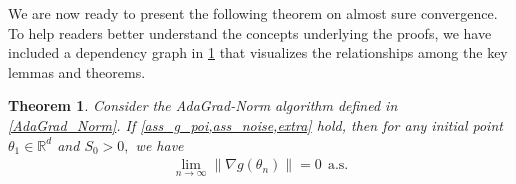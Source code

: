 \documentclass[standalone]{article}
\newtheorem{thm}{Theorem}[section]
\begin{document}
We are now ready to present the following theorem on almost sure convergence. To help readers better understand the concepts underlying the proofs, we have included a dependency graph in \cref{fig:adagrad:norm:struc}  that visualizes the relationships among the key lemmas and theorems. \begin{figure}[omitted: a diagram of this paper's results, not reproduced here]\label{fig:adagrad:norm:struc}\end{figure} 
\begin{thm}\label{convergence_1} 
Consider the AdaGrad-Norm algorithm defined in \cref{AdaGrad_Norm}. If \cref{ass_g_poi,ass_noise,extra} hold, then for any initial point $\theta_{1}\in \mathbb{R}^{d}$ and $S_{0}>0,$ we have
\begin{equation}\nonumber\begin{aligned}
\lim_{n\rightarrow\infty}\|\nabla g(\theta_{n})\|=0\ \ \text{a.s.}
\end{aligned}\end{equation}
\end{thm}	
\end{document}
